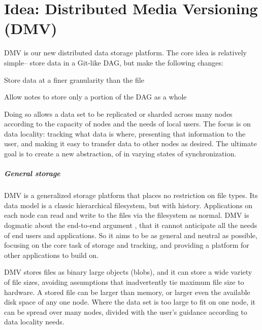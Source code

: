\chapter{Idea: Distributed Media Versioning (DMV)}


\gls{DMV} is our new distributed data storage platform. The core idea is
relatively simple-- store data in a Git-like DAG, but make the following
changes:

\begin{tight_enumerate}

    \item{Store data at a finer granularity than the file}

    \item{Allow notes to store only a portion of the DAG as a whole}

\end{tight_enumerate}

Doing so allows a data set to be replicated or sharded across many nodes
according to the capacity of nodes and the needs of local users. The focus is on
data locality: tracking what data is where, presenting that information to the
user, and making it easy to transfer data to other nodes as desired. The
ultimate goal is to create a new abstraction, of  in varying states of synchronization.


\paragraph{General storage}

\gls{DMV} is a generalized storage platform that places no restriction on file
types. Its data model is a classic hierarchical filesystem, but with history.
Applications on each node can read and write to the files via the filesystem as
normal. \gls{DMV} is dogmatic about the end-to-end argument
\cite{endtoendargument}, that it cannot anticipate all the needs of end users
and applications. So it aims to be as general and neutral as possible, focusing
on the core task of storage and tracking, and providing a platform for other
applications to build on.

\gls{DMV} stores files as binary large objects (\glspl{blob}), and it can store
a wide variety of file sizes, avoiding assumptions that inadvertently tie
maximum file size to hardware. A stored file can be larger than memory, or
larger even the available disk space of any one node. Where the data set is too
large to fit on one node, it can be spread over many nodes, divided with the
user's guidance according to data locality needs.

